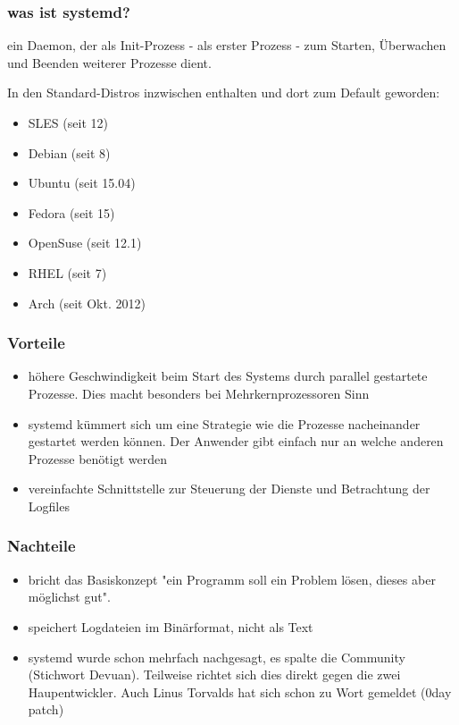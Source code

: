 
\begin{frame}
\frametitle{was ist systemd?}
ein Daemon, der als Init-Prozess - als erster Prozess - zum Starten, Überwachen
und Beenden weiterer Prozesse dient.

In den Standard-Distros inzwischen enthalten und dort zum Default geworden:

\begin{itemize}
  \item SLES (seit 12)
  \item Debian (seit 8)
  \item Ubuntu (seit 15.04)
  \item Fedora (seit 15)
  \item OpenSuse (seit 12.1)
  \item RHEL (seit 7)
  \item Arch (seit Okt. 2012)
\end{itemize}

\end{frame}

\begin{frame}
  \frametitle{Vorteile}
  \begin{itemize}
    \item höhere Geschwindigkeit beim Start des Systems durch parallel gestartete
          Prozesse. Dies macht besonders bei Mehrkernprozessoren Sinn
    \item systemd kümmert sich um eine Strategie wie die Prozesse nacheinander
          gestartet werden können. Der Anwender gibt einfach nur an welche anderen Prozesse benötigt werden
    \item vereinfachte Schnittstelle zur Steuerung der Dienste und Betrachtung der Logfiles
  \end{itemize}
\end{frame}

\begin{frame}
  \frametitle{Nachteile}
  \begin{itemize}
    \item bricht das Basiskonzept "ein Programm soll ein Problem lösen, dieses aber möglichst gut".
    \item speichert Logdateien im Binärformat, nicht als Text
    \item systemd wurde schon mehrfach nachgesagt, es spalte die Community (Stichwort Devuan). Teilweise richtet
  sich dies direkt gegen die zwei Haupentwickler. Auch Linus Torvalds hat sich schon zu Wort gemeldet (0day patch)
  \end{itemize}

\end{frame}

